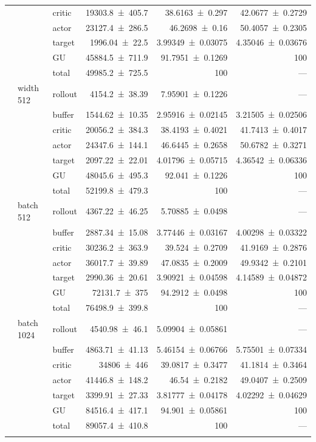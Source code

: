 {\begin{longtable}{@{}lllrrr@{}}
     &  & critic & \num{19303.8+-405.7} & \num{38.6163+-0.297} & \num{42.0677+-0.2729} \\
     &  & actor & \num{23127.4+-286.5} & \num{46.2698+-0.16} & \num{50.4057+-0.2305} \\
     &  & target & \num{1996.04+-22.5} & \num{3.99349+-0.03075} & \num{4.35046+-0.03676} \\
     &  & GU & \num{45884.5+-711.9} & \num{91.7951+-0.1269} & 100 \\
     &  & total & \num{49985.2+-725.5} & \num{100} & --- \\
    \addlinespace[2pt]
     & width 512 & rollout & \num{4154.2+-38.39} & \num{7.95901+-0.1226} & --- \\
     &  & buffer & \num{1544.62+-10.35} & \num{2.95916+-0.02145} & \num{3.21505+-0.02506} \\
     &  & critic & \num{20056.2+-384.3} & \num{38.4193+-0.4021} & \num{41.7413+-0.4017} \\
     &  & actor & \num{24347.6+-144.1} & \num{46.6445+-0.2658} & \num{50.6782+-0.3271} \\
     &  & target & \num{2097.22+-22.01} & \num{4.01796+-0.05715} & \num{4.36542+-0.06336} \\
     &  & GU & \num{48045.6+-495.3} & \num{92.041+-0.1226} & 100 \\
     &  & total & \num{52199.8+-479.3} & \num{100} & --- \\
    \addlinespace[2pt]
     & batch 512 & rollout & \num{4367.22+-46.25} & \num{5.70885+-0.0498} & --- \\
     &  & buffer & \num{2887.34+-15.08} & \num{3.77446+-0.03167} & \num{4.00298+-0.03322} \\
     &  & critic & \num{30236.2+-363.9} & \num{39.524+-0.2709} & \num{41.9169+-0.2876} \\
     &  & actor & \num{36017.7+-39.89} & \num{47.0835+-0.2009} & \num{49.9342+-0.2101} \\
     &  & target & \num{2990.36+-20.61} & \num{3.90921+-0.04598} & \num{4.14589+-0.04872} \\
     &  & GU & \num{72131.7+-375} & \num{94.2912+-0.0498} & 100 \\
     &  & total & \num{76498.9+-399.8} & \num{100} & --- \\
    \addlinespace[2pt]
     & batch 1024 & rollout & \num{4540.98+-46.1} & \num{5.09904+-0.05861} & --- \\
     &  & buffer & \num{4863.71+-41.13} & \num{5.46154+-0.06766} & \num{5.75501+-0.07334} \\
     &  & critic & \num{34806+-446} & \num{39.0817+-0.3477} & \num{41.1814+-0.3464} \\
     &  & actor & \num{41446.8+-148.2} & \num{46.54+-0.2182} & \num{49.0407+-0.2509} \\
     &  & target & \num{3399.91+-27.33} & \num{3.81777+-0.04178} & \num{4.02292+-0.04629} \\
     &  & GU & \num{84516.4+-417.1} & \num{94.901+-0.05861} & 100 \\
     &  & total & \num{89057.4+-410.8} & \num{100} & --- \\
    \addlinespace[2pt]
  \end{longtable}
}

